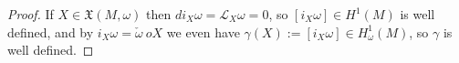 \documentclass[12pt]{amsart}
\theoremstyle{definition}
\def\ga{\gamma}
\def\om{\omega}
\def\X{{\mathfrak X}}
\begin{document}
\begin{proof}
If $X\in\X(M,\om)$ then $di_X\om=\mathcal{L}_X\om = 0$, so 
$[i_X\om]\in H^1(M)$ is well defined, and by $i_X\om= \check\om\ o X$ 
we even have $\ga(X):=[i_X\om]\in H^1_\om(M)$, so $\ga$ is well 
defined. 
\end{proof}



\end{document}
